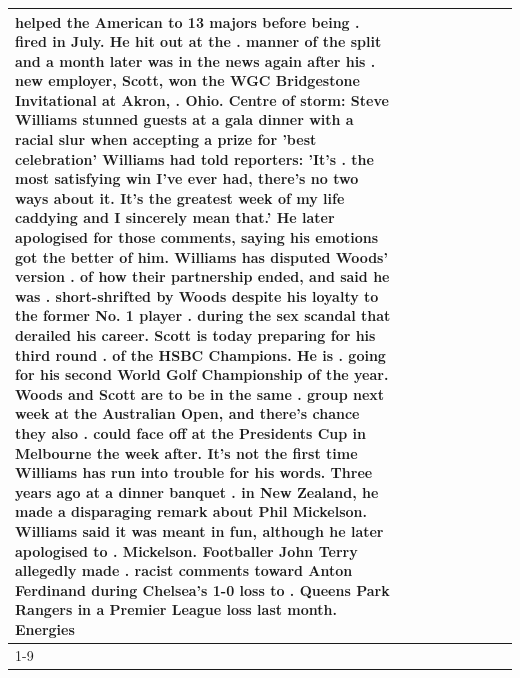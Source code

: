\begin{table}[H]
\begin{tabular}{lllrlllll}
helped the American to 13 majors before being . fired in July. He hit out at the . manner of the split and a month later was in the news again after his . new employer, Scott, won the WGC Bridgestone Invitational at Akron, . Ohio. Centre of storm: Steve Williams stunned guests at a gala dinner with a racial slur when accepting a prize for 'best celebration' Williams had told reporters: 'It's . the most satisfying win I've ever had, there's no two ways about it. It's the greatest week of my life caddying and I sincerely mean that.' He later apologised for those comments, saying his emotions got the better of him. Williams has disputed Woods' version . of how their partnership ended, and said he was . short-shrifted by Woods despite his loyalty to the former No. 1 player . during the sex scandal that derailed his career. Scott is today preparing for his third round . of the HSBC Champions. He is . going for his second World Golf Championship of the year. Woods and Scott are to be in the same . group next week at the Australian Open, and there's chance they also . could face off at the Presidents Cup in Melbourne the week after. It's not the first time Williams has run into trouble for his words. Three years ago at a dinner banquet . in New Zealand, he made a disparaging remark about Phil Mickelson. Williams said it was meant in fun, although he later apologised to . Mickelson. Footballer John Terry allegedly made . racist comments toward Anton Ferdinand during Chelsea's 1-0 loss to . Queens Park Rangers in a Premier League loss last month. Energies \\
\cline{1-9}

\end{tabular}
\end{table}
